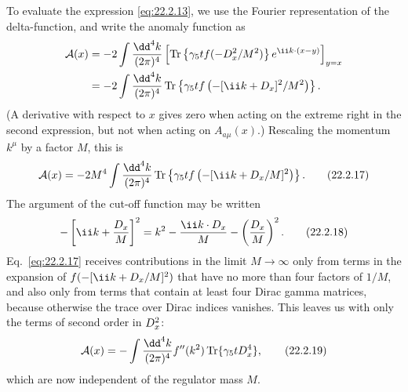 To evaluate the expression \eqref{eq:22.2.13}, we use the Fourier
representation of the delta-function, and write the anomaly function as
\[
 \begin{aligned}
 \mathcal A(x)
 &=-2\int\frac{\dd^4k}{(2\pi)^4}
 \left[
  \operatorname{Tr}\left\{\gamma_5t f(-\sl{D}_x^2/M^2)\right\}
  e^{\ii k\cdot(x-y)}
 \right]_{y=x}\\
 &=-2\int\frac{\dd^4k}{(2\pi)^4}
 \operatorname{Tr}\left\{\gamma_5t
 f\left(-[\ii\sl{k}+\sl{D}_x]^2/M^2\right)\right\}.
 \end{aligned}
\]
(A derivative with respect to $x$ gives zero when acting on the extreme
right in the second expression, but not when acting on
$A_{a\mu}(x)$.) Rescaling the momentum $k^\mu$ by a factor $M$, this
is
\begin{equation}
 \mathcal A(x)=-2M^4\int\frac{\dd^4k}{(2\pi)^4}
 \operatorname{Tr}\left\{\gamma_5t
 f\left(-[\ii\sl{k}+\sl{D}_x/M]^2\right)\right\}.
 \tag{22.2.17}\label{eq:22.2.17}
\end{equation}
The argument of the cut-off function may be written
\begin{equation}
 -\left[\ii\sl{k}+\frac{\sl{D}_x}{M}\right]^2
 =k^2-\frac{\ii k\cdot D_x}{M}
 -\left(\frac{\sl{D}_x}{M}\right)^2.
 \tag{22.2.18}\label{eq:22.2.18}
\end{equation}
Eq.~\eqref{eq:22.2.17} receives contributions in the limit
$M\to\infty$ only from terms in the expansion of
$f(-[\ii\sl{k}+\sl{D}_x/M]^2)$ that have no more than four factors of
$1/M$, and also only from terms that contain at least four Dirac gamma
matrices, because otherwise the trace over Dirac indices vanishes. This
leaves us with only the terms of second order in $\sl{D}_x^2$:
\begin{equation}
 \mathcal A(x)=-\int\frac{\dd^4k}{(2\pi)^4}f''(k^2)
 \operatorname{Tr}\{\gamma_5t\sl{D}_x^4\},
 \tag{22.2.19}\label{eq:22.2.19}
\end{equation}
which are now independent of the regulator mass $M$.

